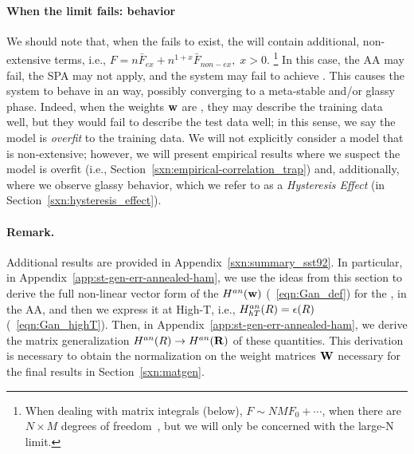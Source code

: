 {\paragraph{When the limit fails: \ATypical behavior}
We should note that, when the \ThermodynamicLimit fails to exist, the \FreeEnergy will contain additional, non-extensive terms, i.e.,
$F = n\bar{F}_{ex} + n^{1+x}\bar{F}_{non-ex},\;x>0$.
\footnote{When dealing with matrix integrals (below), $F\sim NMF_{0}+\cdots$, when there are $N \times M$ degrees
of freedom~\cite{PP95}, but we will only be concerned with the large-N limit.}
In this case, the AA may fail, the SPA may not apply, and the system may fail to achieve \SelfAveraging.
This causes the system to behave in an \ATypical way, 
possibly converging to a meta-stable and/or glassy phase.
Indeed, when the weights ${\mathbf{w}}$ are \emph{\ATypical}, they may describe the training data well, 
but they would fail to describe the test data well; in this sense, we say the model is \emph{overfit} to the training data.
We will not explicitly consider a model that is non-extensive; however, we will
present empirical results where we suspect the model is overfit
(i.e., Section~\ref{sxn:empirical-correlation_trap})
and, additionally, where we observe glassy behavior, which we refer to as a \emph{Hysteresis Effect}
(in Section~\ref{sxn:hysteresis_effect}).



\paragraph{Remark.} 
Additional results are provided in Appendix~\ref{sxn:summary_sst92}.
In particular, in Appendix~\ref{app:st-gen-err-annealed-ham}, we use the ideas from this section to derive the full non-linear vector form of the \AnnealedHamiltonian $H^{an}({\mathbf{w}})$ (\EQN~\ref{eqn:Gan_def})
for the \LinearPerceptron, in the AA, and then we express it at High-T, i.e.,
$H^{an}_{hT}(R)=\epsilon(R)$ (\EQN~\ref{eqn:Gan_highT}).  
Then, in Appendix~\ref{app:st-gen-err-annealed-ham}, we derive the matrix generalization
$H^{an}(R)\rightarrow H^{an}(\mathbf{R})$ of these quantities.
This derivation is necessary to obtain the normalization on the weight matrices ${\mathbf{W}}$ necessary for the final results in Section~\ref{sxn:matgen}.


}
